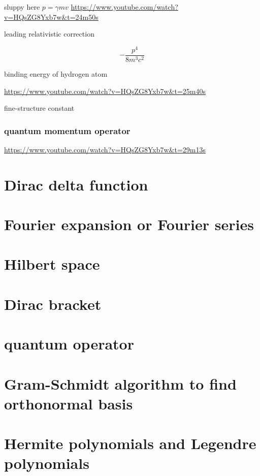 \documentclass[
]{book}
\theoremstyle{definition}
\theoremstyle{definition}
\theoremstyle{definition}
\theoremstyle{definition}
\theoremstyle{remark}
\begin{document}
sluppy here \(p=\gamma mv\) \url{https://www.youtube.com/watch?v=HQsZG8Yxb7w&t=24m50s}

leading relativistic correction

\[
-\dfrac{p^{4}}{8m^{3}c^{2}}
\]

binding energy of hydrogen atom

\url{https://www.youtube.com/watch?v=HQsZG8Yxb7w&t=25m40s}

fine-structure constant

\subsubsection{quantum momentum operator}\label{quantum-momentum-operator}

\url{https://www.youtube.com/watch?v=HQsZG8Yxb7w&t=29m13s}

\section{Dirac delta function}\label{dirac-delta-function}

\section{Fourier expansion or Fourier series}\label{fourier-expansion-or-fourier-series}

\section{Hilbert space}\label{hilbert-space-1}

\section{Dirac bracket}\label{dirac-bracket}

\section{quantum operator}\label{quantum-operator}

\section{Gram-Schmidt algorithm to find orthonormal basis}\label{gram-schmidt-algorithm-to-find-orthonormal-basis}

\section{Hermite polynomials and Legendre polynomials}\label{hermite-polynomials-and-legendre-polynomials}
\end{document}
